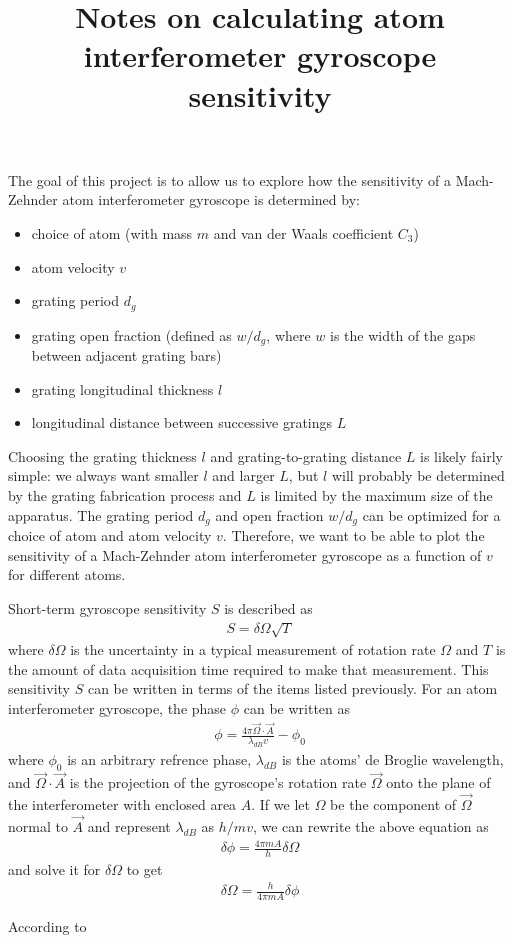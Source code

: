 \documentclass[twocolumn,pra,showpacs,superscriptaddress,longbibliography]{revtex4-1}   %
\begin{document}
\title{Notes on calculating atom interferometer gyroscope sensitivity}
\maketitle


The goal of this project is to allow us to explore how the sensitivity of a Mach-Zehnder atom interferometer gyroscope is determined by:
\begin{itemize}
	\item choice of atom (with mass $m$ and van der Waals coefficient $C_3$)
	\item atom velocity $v$
	\item grating period $d_g$
	\item grating open fraction (defined as $w/d_g$, where $w$ is the width of the gaps between adjacent grating bars)
	\item grating longitudinal thickness $l$
	\item longitudinal distance between successive gratings $L$
\end{itemize}
Choosing the grating thickness $l$ and grating-to-grating distance $L$ is likely fairly simple: we always want smaller $l$ and larger $L$, but $l$ will probably be determined by the grating fabrication process and $L$ is limited by the maximum size of the apparatus. The grating period $d_g$ and open fraction $w/d_g$ can be optimized for a choice of atom and atom velocity $v$. Therefore, we want to be able to plot the sensitivity of a Mach-Zehnder atom interferometer gyroscope as a function of $v$ for different atoms.


Short-term gyroscope sensitivity $S$ is described as 
\begin{align}
	S = \delta\Omega \sqrt{T}
	\label{sensitivityGeneral}
\end{align}
where $\delta\Omega$ is the uncertainty in a typical measurement of rotation rate $\Omega$ and $T$ is the amount of data acquisition time required to make that measurement.
This sensitivity $S$ can be written in terms of the items listed previously.
For an atom interferometer gyroscope, the phase $\phi$ can be written as
\begin{align}
	\phi = \frac{4\pi\vec{\Omega}\cdot\vec{A}}{\lambda_{dB} v} - \phi_0
\end{align}
where $\phi_0$ is an arbitrary refrence phase, $\lambda_{dB}$ is the atoms' de Broglie wavelength, and $\vec{\Omega}\cdot\vec{A}$ is the projection of the gyroscope's rotation rate $\vec{\Omega}$ onto the plane of the interferometer with enclosed area $A$. If we let $\Omega$ be the component of $\vec{\Omega}$ normal to $\vec{A}$ and represent $\lambda_{dB}$ as $h/mv$, we can rewrite the above equation as
\begin{align}
	\delta\phi = \frac{4\pi m A}{h}\delta\Omega
\end{align}
and solve it for $\delta\Omega$ to get
\begin{align}
	\delta\Omega = \frac{h}{4\pi m A}\delta\phi
\end{align}

According to \cite{Hromada2014}







\end{document}
